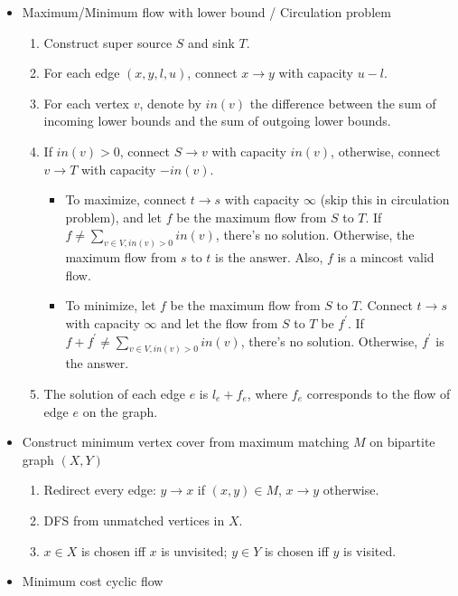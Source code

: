 \begin{itemize}
  \item Maximum/Minimum flow with lower bound / Circulation problem
    \begin{enumerate}
      \item Construct super source $S$ and sink $T$.
      \item For each edge $(x, y, l, u)$, connect $x \rightarrow y$ with capacity $u - l$.
      \item For each vertex $v$, denote by $in(v)$ the difference between the sum of incoming lower bounds and the sum of outgoing lower bounds.
      \item If $in(v) > 0$, connect $S \rightarrow v$ with capacity $in(v)$, otherwise, connect $v \rightarrow T$ with capacity $-in(v)$.
        \begin{itemize}
          \item To maximize, connect $t \rightarrow s$ with capacity $\infty$ (skip this in circulation problem), and let $f$ be the maximum flow from $S$ to $T$. If $f \neq \sum_{v \in V, in(v) > 0}{in(v)}$, there's no solution. Otherwise, the maximum flow from $s$ to $t$ is the answer. Also, $f$ is a mincost valid flow.
          \item To minimize, let $f$ be the maximum flow from $S$ to $T$. Connect $t \rightarrow s$ with capacity $\infty$ and let the flow from $S$ to $T$ be $f^\prime$. If $f + f^\prime \neq \sum_{v \in V, in(v) > 0}{in(v)}$, there's no solution. Otherwise, $f^\prime$ is the answer.
        \end{itemize}
      \item The solution of each edge $e$ is $l_e + f_e$, where $f_e$ corresponds to the flow of edge $e$ on the graph.
    \end{enumerate}
  \item Construct minimum vertex cover from maximum matching $M$ on bipartite graph $(X, Y)$
    \begin{enumerate}
      \item Redirect every edge: $y \rightarrow x$ if $(x, y) \in M$, $x \rightarrow y$ otherwise.
      \item DFS from unmatched vertices in $X$.
      \item $x \in X$ is chosen iff $x$ is unvisited; $y \in Y$ is chosen iff $y$ is visited.
    \end{enumerate}
  \item Minimum cost cyclic flow
    \begin{enumerate}

\end{enumerate}
\end{itemize}
